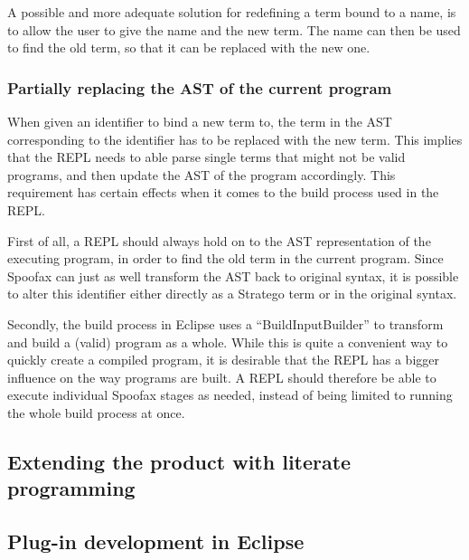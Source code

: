 A possible and more adequate solution for redefining a term bound to a
name, is to allow the user to give the name and the new term. The name
can then be used to find the old term, so that it can be replaced with
the new one.

\subsubsection{Partially replacing the AST of the current program}
When given an identifier to bind a new term to, the term in the AST
corresponding to the identifier has to be replaced with the new term.
This implies that the REPL needs to able parse single terms that might
not be valid programs, and then update the AST of the program accordingly.
This requirement has certain effects when it comes to the build process
used in the REPL.

First of all, a REPL should always hold on to the AST representation of the
executing program, in order to find the old term in the current program.
Since Spoofax can just as well transform the AST back to original syntax,
it is possible to alter this identifier either directly as a Stratego term or
in the original syntax.

Secondly, the build process in Eclipse uses a ``BuildInputBuilder'' to
transform and build a (valid) program as a whole. While this is quite
a convenient way to quickly create a compiled program, it is desirable
that the REPL has a bigger influence on the way programs are built. A
REPL should therefore be able to execute individual Spoofax stages as
needed, instead of being limited to running the whole build process at
once.

\subsection{Extending the product with literate programming}
\label{sec:extend-prod-with}

\subsection{Plug-in development in Eclipse}
\label{ssec:eclipse-plugins}

